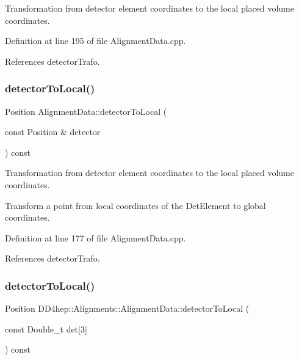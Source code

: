 Transformation from detector element coordinates to the local placed volume coordinates. 



Definition at line 195 of file Alignment\+Data.\+cpp.



References detector\+Trafo.

\hypertarget{class_d_d4hep_1_1_alignments_1_1_alignment_data_a50c1fafca870e727b494ac639a4ba419}{}\label{class_d_d4hep_1_1_alignments_1_1_alignment_data_a50c1fafca870e727b494ac639a4ba419} 
\subsubsection{\texorpdfstring{detector\+To\+Local()}{detectorToLocal()}\hspace{0.1cm}{\footnotesize\ttfamily [3/4]}}
{\footnotesize\ttfamily Position Alignment\+Data\+::detector\+To\+Local (\begin{DoxyParamCaption}\item[{const Position \&}]{detector }\end{DoxyParamCaption}) const}



Transformation from detector element coordinates to the local placed volume coordinates. 

Transform a point from local coordinates of the Det\+Element to global coordinates. 

Definition at line 177 of file Alignment\+Data.\+cpp.



References detector\+Trafo.

\hypertarget{class_d_d4hep_1_1_alignments_1_1_alignment_data_acb3d2cf0447ab891e095afe0c33dc388}{}\label{class_d_d4hep_1_1_alignments_1_1_alignment_data_acb3d2cf0447ab891e095afe0c33dc388} 
\subsubsection{\texorpdfstring{detector\+To\+Local()}{detectorToLocal()}\hspace{0.1cm}{\footnotesize\ttfamily [4/4]}}
{\footnotesize\ttfamily Position D\+D4hep\+::\+Alignments\+::\+Alignment\+Data\+::detector\+To\+Local (\begin{DoxyParamCaption}\item[{const Double\+\_\+t}]{det\mbox{[}3\mbox{]} }\end{DoxyParamCaption}) const\hspace{0.3cm}{\ttfamily [inline]}}



